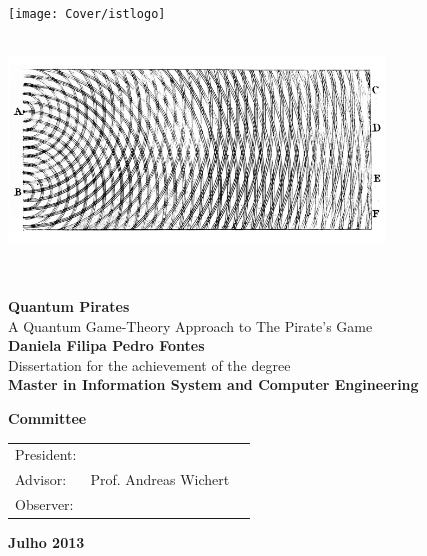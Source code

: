 \setcounter{page}{1} 


\thispagestyle{empty}
\begin{flushleft} ~\\ \vspace{-10mm} \hspace{-9mm}  \texttt{[image: Cover/istlogo]} 
\\ \vspace{5mm}
~\\ \begin{center} \includegraphics[height=50mm]{Figures/Cover/bU-lachas.png}  \end{center} %
~\\ \vspace{5mm}
\begin{centering}
\LARGE \textbf{Quantum Pirates}
\\ \vspace{5mm}
\Large A Quantum Game-Theory Approach to The Pirate's Game
\\ \vspace{15mm}
\Large \textbf{Daniela Filipa Pedro Fontes}
\\ \vspace{15mm}
\large Dissertation for the achievement of the degree
\\ \vspace{2mm}
\LARGE \textbf{Master in Information System and Computer Engineering}
\\ \vspace{20mm}

\Large \textbf{Committee}
\\ \vspace{7mm}
\begin{tabular}{lcl}
\large President: 	&   & \large \\ 
\large Advisor:   &Prof. Andreas Wichert& \large \\ 
\large Observer:	 				&   & \large \\
\end{tabular}
 
\vspace{7mm}

\Large \textbf{Julho 2013} \\
\end{centering}
\let\thepage\relax
\end{flushleft}
\pagebreak


